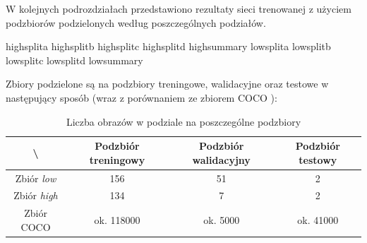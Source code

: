 W kolejnych podrozdziałach przedstawiono rezultaty sieci trenowanej z użyciem podzbiorów podzielonych według poszczególnych podziałów.


{highsplita}
{highsplitb}
{highsplitc}
{highsplitd}
{highsummary}
{lowsplita}
{lowsplitb}
{lowsplitc}
{lowsplitd}
{lowsummary}

\newpage
Zbiory podzielone są na podzbiory treningowe, walidacyjne oraz testowe w następujący sposób (wraz z porównaniem ze zbiorem COCO \cite{coco}):

\begin{table}[!h]
	\centering
	\caption{Liczba obrazów w podziale na poszczególne podzbiory}
	\vspace{6pt}
	{\footnotesize
		\begin{tabular}{|c|c|c|c|}
			\hline \textbackslash & Podzbiór treningowy & Podzbiór walidacyjny & Podzbiór testowy \\
      \hline Zbiór \textit{low} & 156 & 51 & 2 \\
      \hline Zbiór \textit{high} & 134 & 7 & 2 \\
      \hline Zbiór COCO & ok. 118000 & ok. 5000 & ok. 41000 \\
      \hline
		\end{tabular}
	}
	\vspace{0pt}
\end{table}

